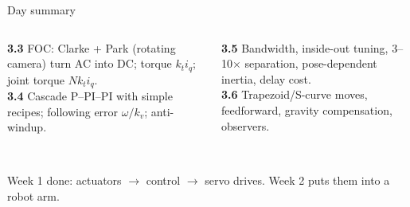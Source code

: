 \documentclass[aspectratio=169,10pt]{beamer}
\begin{document}
\begin{frame}[t]{Day summary}
\begin{columns}[T,onlytextwidth]
\begin{defbox}
\small
\textbf{3.3} FOC: Clarke + Park (rotating camera) turn AC into DC; torque $k_ti_q$; joint torque $Nk_ti_q$.\\[1mm]
\textbf{3.4} Cascade P--PI--PI with simple recipes; following error $\omega/k_v$; anti-windup.
\end{defbox}
\begin{defbox}
\small
\textbf{3.5} Bandwidth, inside-out tuning, 3--10$\times$ separation, pose-dependent inertia, delay cost.\\[1mm]
\textbf{3.6} Trapezoid/S-curve moves, feedforward, gravity compensation, observers.
\end{defbox}
\end{columns}
\vspace{3mm}
\centering
{}\\[2mm]
\small Week 1 done: actuators $\rightarrow$ control $\rightarrow$ servo drives. Week 2 puts them into a robot arm.
\end{frame}
\end{document}
